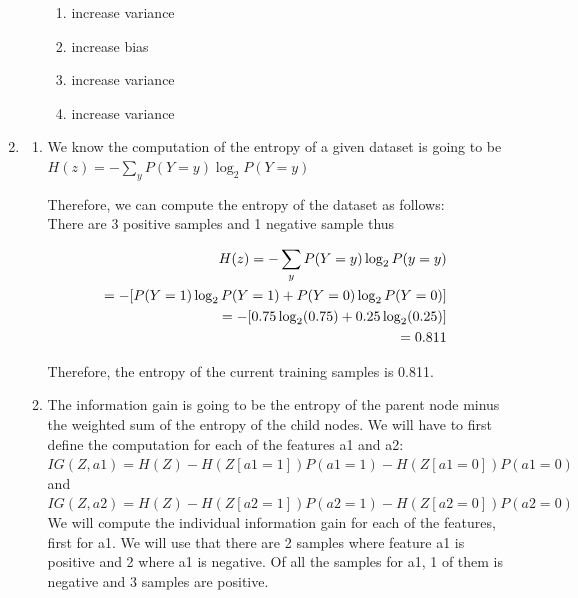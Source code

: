 \documentclass[12pt]{article}
\begin{document}
\begin{enumerate}
\begin{enumerate}
    \begin{enumerate}
      \item increase variance 
      \item increase bias 
      \item increase variance 
      \item increase variance
    \end{enumerate}

  \end{enumerate}

\item
  \begin{enumerate}
  \item We know the computation of the entropy of a given dataset is going to be $H(z) = -\sum_{y}P(Y=y)\log_2 P(Y=y)$
  
  Therefore, we can compute the entropy of the dataset as follows: \\ 

  There are 3 positive samples and 1 negative sample thus  

    \begin{align}
      H(z) = -\sum_y{P(Y=y)\log_2 P(y=y)} \notag \\ 
      = -[P(Y=1)\log_2 P(Y=1) + P(Y=0)\log_2 P(Y=0)] \notag \\ 
      = -[0.75 \log_2 (0.75) + 0.25 \log_2 (0.25)] \notag \\ 
      = 0.811 \notag
    \end{align}

    Therefore, the entropy of the current training samples is 0.811.

  \item The information gain is going to be the entropy of the parent node minus the weighted sum of the entropy of the child nodes. We will have to first define the computation for each of the features a1 and a2: \\ 
  
  $IG(Z, a1) = H(Z) - H(Z[a1 = 1])P(a1 = 1) - H(Z[a1=0])P(a1=0)$ and \\ 

  $IG(Z, a2) = H(Z) - H(Z[a2 = 1])P(a2 = 1) - H(Z[a2=0])P(a2=0)$ \\ 

  We will compute the individual information gain for each of the features, first for a1. We will use that there are 2 samples where feature a1 is positive and 2 where a1 is negative. Of all the samples for a1, 1 of them is negative and 3 samples are positive.


\end{enumerate}
\end{enumerate}
\end{document}
